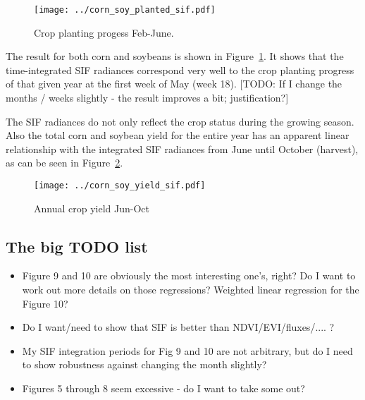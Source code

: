 \documentclass[preprint, a4paper, 10pt, times]{elsarticle}
\begin{document}
\begin{figure}[htbp]
\centering
\texttt{[image: ../corn\_soy\_planted\_sif.pdf]}
\caption{Crop planting progess Feb-June.}
\label{fig:corn_soy_planted_sif}
\end{figure}

The result for both corn and soybeans is shown in Figure~\ref{fig:corn_soy_planted_sif}. It shows that the time-integrated SIF radiances correspond very well to the crop planting progress of that given year at the first week of May (week 18). [TODO: If I change the months / weeks slightly - the result improves a bit; justification?]

The SIF radiances do not only reflect the crop status during the growing season. Also the total corn and soybean yield for the entire year has an apparent linear relationship with the integrated SIF radiances from June until October (harvest), as can be seen in Figure~\ref{fig:corn_soy_yield_sif}.

\begin{figure}[htbp]
\centering
\texttt{[image: ../corn\_soy\_yield\_sif.pdf]}
\caption{Annual crop yield Jun-Oct}
\label{fig:corn_soy_yield_sif}
\end{figure}

\subsection{The big TODO list}

\begin{itemize}
\item Figure 9 and 10 are obviously the most interesting one's, right? Do I want to work out more details on those regressions? Weighted linear regression for the Figure 10?
\item Do I want/need to show that SIF is better than NDVI/EVI/fluxes/.... ?
\item My SIF integration periods for Fig 9 and 10 are not arbitrary, but do I need to show robustness against changing the month slightly?
\item Figures 5 through 8 seem excessive - do I want to take some out?
\end{itemize}

\section*{}

\end{document}
